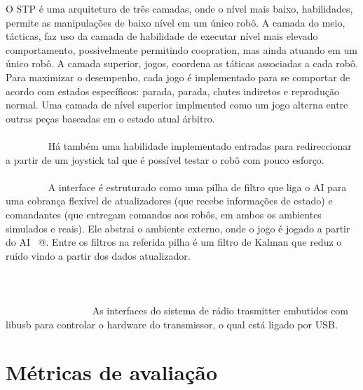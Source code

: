 O STP é uma arquitetura de três camadas, onde o nível mais baixo, habilidades,
permite as manipulações de baixo nível em um único robô. A camada do meio,
tácticas, faz uso da camada de habilidade de executar nível mais elevado
comportamento, possivelmente permitindo coopration, mas ainda atuando em um
único robô. A camada superior, jogos, coordena as táticas associadas a cada
robô. Para maximizar o desempenho, cada jogo é implementado para se comportar de
acordo com estados específicos: parada, parada, chutes indiretos e reprodução normal. 
Uma camada de nível superior implmented como um jogo alterna entre outras peças
baseadas em o estado atual árbitro.
                                                                                
Há também uma habilidade implementado entradas para redireccionar a partir de um
joystick tal que é possível testar o robô com pouco esforço.
                                                                                
A interface é estruturado como uma pilha de filtro que liga o AI para uma
cobrança flexível de atualizadores (que recebe informações de estado) e
  comandantes (que entregam comandos aos robôs, em ambos os ambientes simulados
e reais).
Ele abstrai o ambiente externo, onde o jogo é jogado a partir do AI \ @.
Entre os filtros na referida pilha é um filtro de Kalman que reduz o ruído vindo
a partir dos dados atualizador.
                                                                                                                                                                                                                                         
As interfaces do sistema de rádio trasmitter embutidos com libusb para controlar
o hardware do transmissor, o qual está ligado por USB.
\section{Métricas de avaliação}\label{sec:metricas}
